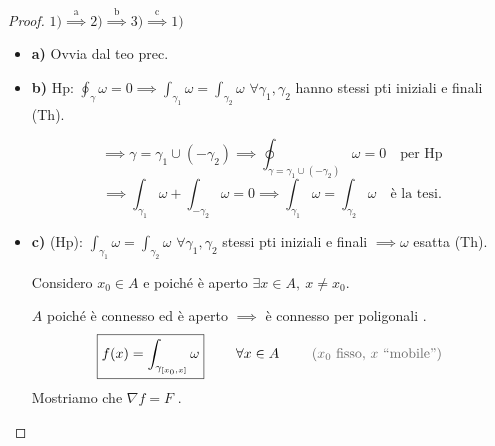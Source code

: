 \begin{proof}
$1) \overset{\text{a}}{\implies} 2) \overset{\text{b}}{\implies} 3) \overset{\text{c}}{\implies} 1)$

\begin{itemize}
    \item \textbf{a)} Ovvia dal teo prec.

    \item \textbf{b)} Hp: $\displaystyle\oint_\gamma \omega = 0 \implies \int_{\gamma_1} \omega = \int_{\gamma_2} \omega$ $\forall \gamma_1, \gamma_2$ hanno stessi pti iniziali e finali (Th).

    \begin{center}
    \end{center}
    \[
    \implies \gamma = \gamma_1 \cup (-\gamma_2) \implies \oint_{\gamma = \gamma_1 \cup (-\gamma_2)} \omega = 0 \quad \text{per Hp}
    \]
    \[
    \implies \int_{\gamma_1} \omega + \int_{-\gamma_2} \omega = 0 \implies \int_{\gamma_1} \omega = \int_{\gamma_2} \omega \quad \text{è la tesi.}
    \]

    \item \textbf{c)} (Hp): $\displaystyle\int_{\gamma_1} \omega = \int_{\gamma_2} \omega$ $\forall \gamma_1, \gamma_2$ stessi pti iniziali e finali $\implies \omega$ esatta (Th).

    Considero $x_0 \in A$ e poiché è aperto $\exists x \in A, \ x \neq x_0$.

    $A$ poiché è connesso ed è aperto $\implies$ è connesso per poligonali .
    \[
    \boxed{f(x) = \int_{\gamma_{[x_0, x]}} \omega} \qquad \forall x \in A \qquad \text{\pencilnote{($x_0$ fisso, $x$ ``mobile'')}}
    \]
    Mostriamo che $\nabla f = F$ .


\end{itemize}
\end{proof}
